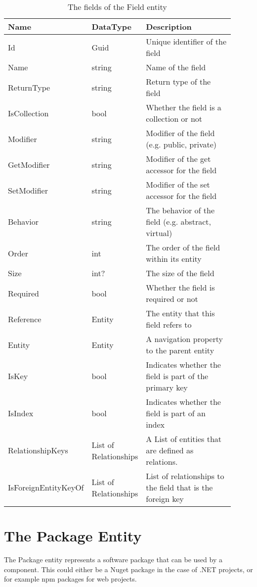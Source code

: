 \begin{table}[H]
\small
\begin{tabular}{ p{0.24\linewidth} p{0.23\linewidth} p{0.44\linewidth} }
\hline
\textbf{Name} & \textbf{DataType} & \textbf{Description} \\
\hline
Id & Guid & Unique identifier of the field \\
Name & string & Name of the field \\
ReturnType & string & Return type of the field \\
IsCollection & bool & Whether the field is a collection or not \\
Modifier & string & Modifier of the field (e.g. public, private) \\
GetModifier & string & Modifier of the get accessor for the field \\
SetModifier & string & Modifier of the set accessor for the field \\
Behavior & string & The behavior of the field (e.g. abstract, virtual) \\
Order & int & The order of the field within its entity \\
Size & int? & The size of the field \\
Required & bool & Whether the field is required or not \\
Reference & Entity & The entity that this field refers to\\
Entity & Entity & A navigation property to the parent entity \\
IsKey & bool & Indicates whether the field is part of the primary key \\
IsIndex & bool & Indicates whether the field is part of an index \\
RelationshipKeys & List of Relationships & A List of entities that are defined as relations. \\
IsForeignEntityKeyOf & List of Relationships & List of relationships to the field that is the foreign key \\
\hline
\end{tabular}
\caption{The fields of the Field entity}
\label{table:field_entity}
\end{table}

\section{The Package Entity}

The Package entity represents a software package that can be used by a component. This
could either be a Nuget package in the case of .NET projects, or for example npm packages
for web projects.

